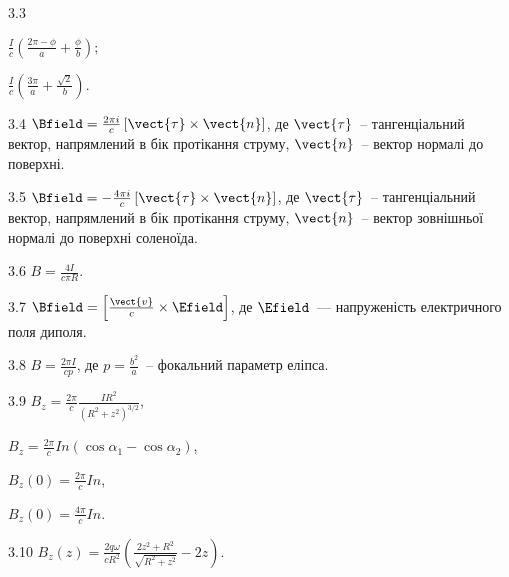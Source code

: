 \protect \section *{}
\begin{Solution}{3.{3}}
	\begin{enumerate*}[label = \alph*)]
		\item $\frac{I}{c} \left( \frac{2\pi - \phi}{a}  + \frac{\phi}{b}\right) $;
		\item $\frac{I}{c} \left( \frac{3\pi}{a}  + \frac{\sqrt2}{b}\right) $.
	\end{enumerate*}
\end{Solution}
\begin{Solution}{3.{4}}
	$\Bfield = \frac{2\pi i }{c} \left[ \vect{\tau}\times\vect{n}\right] $, де $\vect{\tau}$~-- тангенціальний вектор, напрямлений в бік протікання струму, $\vect{n}$~-- вектор нормалі до поверхні.
\end{Solution}
\begin{Solution}{3.{5}}
			$\Bfield = - \frac{4\pi i }{c} \left[ \vect{\tau}\times\vect{n}\right] $, де $\vect{\tau}$~-- тангенціальний вектор, напрямлений в бік протікання струму, $\vect{n}$~-- вектор зовнішньої нормалі до поверхні соленоїда.
	
\end{Solution}
\begin{Solution}{3.{6}}
	$B = \frac{4I}{c\pi R}$.
\end{Solution}
\begin{Solution}{3.{7}}
	$\Bfield = \left[ \frac{\vect{v}}{c}\times\Efield\right]  $, де $\Efield$~--- напруженість електричного поля диполя.
\end{Solution}
\begin{Solution}{3.{8}}
	$B = \frac{2\pi I}{cp}$, де $p = \frac{b^2}{a}$~-- фокальний параметр еліпса.
\end{Solution}
\begin{Solution}{3.{9}}
	$B_z = \frac{2\pi}{c}\frac{I R^2}{(R^2 + z^2)^{3/2}}$,
	\begin{enumerate*}[label=\alph*)]
		\item $B_z = \frac{2\pi}{c} In (\cos\alpha_1 - \cos\alpha_2)$,
		\item $B_z(0) = \frac{2\pi}{c} In$,
		\item $B_z(0) = \frac{4\pi}{c} In$.
	\end{enumerate*}
\end{Solution}
\begin{Solution}{3.{10}}
	$B_z(z) = \frac{2q\omega}{cR^2}\left(\frac{2z^2 + R^2}{\sqrt{R^2 + z^2}} - 2z\right)$.
\end{Solution}
